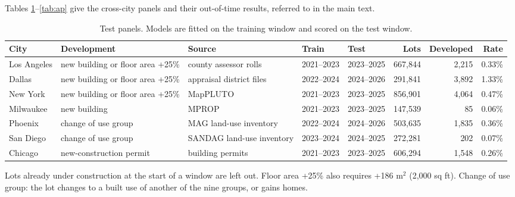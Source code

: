 \documentclass[10pt]{article}
\begin{document}
Tables \ref{tab:panels}--\ref{tab:ap} give the cross-city panels and their out-of-time results, referred to in the
main text.

\begin{table}[h!]
\centering
\scriptsize
\setlength{\tabcolsep}{4pt}
\caption{Test panels. Models are fitted on the training window and scored on the test window.}
\label{tab:panels}
\begin{tabular}{lllllrrr}
\toprule
City & Development & Source & Train & Test & Lots & Developed & Rate \\
\midrule
Los Angeles & new building or floor area +25\% & county assessor rolls & 2021--2023 & 2023--2025 & 667{,}844 & 2{,}215 & 0.33\% \\
Dallas & new building or floor area +25\% & appraisal district files & 2022--2024 & 2024--2026 & 291{,}841 & 3{,}892 & 1.33\% \\
New York & new building or floor area +25\% & MapPLUTO & 2021--2023 & 2023--2025 & 856{,}901 & 4{,}064 & 0.47\% \\
Milwaukee & new building & MPROP & 2021--2023 & 2023--2025 & 147{,}539 & 85 & 0.06\% \\
Phoenix & change of use group & MAG land-use inventory & 2022--2024 & 2024--2026 & 503{,}635 & 1{,}835 & 0.36\% \\
San Diego & change of use group & SANDAG land-use inventory & 2023--2024 & 2024--2025 & 272{,}281 & 202 & 0.07\% \\
Chicago & new-construction permit & building permits & 2021--2023 & 2023--2025 & 606{,}294 & 1{,}548 & 0.26\% \\
\bottomrule
\end{tabular}
\par\smallskip
\begin{minipage}{0.95\linewidth}\footnotesize Lots already under construction at the start of a window are left out. Floor area +25\% also requires +186 m$^2$ (2,000 sq ft). Change of use group: the lot changes to a built use of another of the nine groups, or gains homes.\end{minipage}
\end{table}
\end{document}
